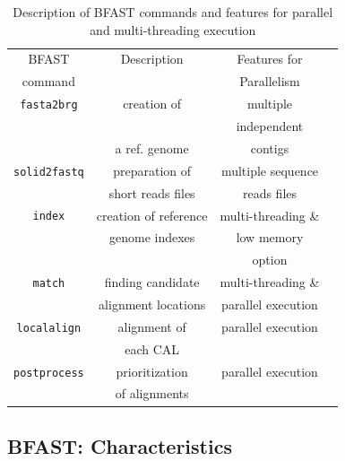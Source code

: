 \documentclass{acm_proc_article-sp}
\begin{document}
\begin{table}
\begin{tabular}{|c|c|c|c|} 
  \hline 
 BFAST  & Description & Features for \\ 
command  &  &     Parallelism \\ \hline \hline
\texttt{fasta2brg} & creation of   &    multiple   \\ 
&& independent \\
& a ref. genome & contigs \\
\hline 
\texttt{solid2fastq}  &  preparation of &     multiple sequence \\ 
& short reads files & reads files\\
\hline

\texttt{index} & creation of reference & multi-threading \& \\
& genome indexes  & low memory  \\ 
&&option \\
 
  \hline
\texttt{match} & finding candidate   &  multi-threading \& \\


& alignment locations &  parallel execution \\ \hline
\texttt{localalign} & alignment of&   parallel execution \\
&  each CAL   & \\

  \hline
\texttt{postprocess} & prioritization   &  parallel execution \\ 
& of alignments & \\
\hline


\hline
\end{tabular} \caption{Description of BFAST commands and features for parallel and multi-threading execution}
 \label{table:bfast-summary} 
\end{table}



\subsection{BFAST: Characteristics}
\end{document}
